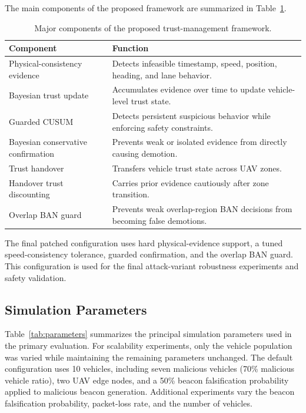 \documentclass[journal]{IEEEtran}
\begin{document}
The main components of the proposed framework are summarized in Table~\ref{tab:framework_components}.

\begin{table}[!t]
\centering
\caption{Major components of the proposed trust-management framework.}
\label{tab:framework_components}
\begin{tabularx}{\columnwidth}{l X}
\toprule
\textbf{Component} & \textbf{Function} \\
\midrule
Physical-consistency evidence & Detects infeasible timestamp, speed, position, heading, and lane behavior. \\
Bayesian trust update & Accumulates evidence over time to update vehicle-level trust state. \\
Guarded CUSUM & Detects persistent suspicious behavior while enforcing safety constraints. \\
Bayesian conservative confirmation & Prevents weak or isolated evidence from directly causing demotion. \\
Trust handover & Transfers vehicle trust state across UAV zones. \\
Handover trust discounting & Carries prior evidence cautiously after zone transition. \\
Overlap BAN guard & Prevents weak overlap-region BAN decisions from becoming false demotions. \\
\bottomrule
\end{tabularx}
\end{table}

The final patched configuration uses hard physical-evidence support, a tuned speed-consistency tolerance, guarded confirmation, and the overlap BAN guard. This configuration is used for the final attack-variant robustness experiments and safety validation.

\subsection{Simulation Parameters}
\label{subsec:simulation_parameters}

Table~\ref{tab:parameters} summarizes the principal simulation parameters used
in the primary evaluation. For scalability experiments, only the vehicle
population was varied while maintaining the remaining parameters unchanged. The
default configuration uses 10 vehicles, including seven malicious vehicles
(70\% malicious vehicle ratio), two UAV edge nodes, and a 50\% beacon
falsification probability applied to malicious beacon generation. Additional
experiments vary the beacon falsification probability, packet-loss rate, and
the number of vehicles.
\end{document}
